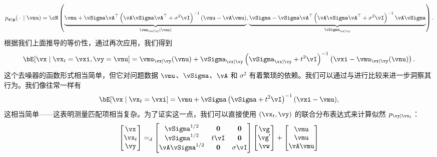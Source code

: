 \documentclass[../../book-main.tex]{subfiles}
\begin{document}
\begin{example}
  \begin{equation}
    p_{\x \mid \y}(\spcdot \mid \vnu) = \cN\left(
    \underbrace{%
      \vmu + \vSigma\vA^\top \left(\vA\vSigma\vA^\top + \sigma^2 \vI\right)^{-1} 
      (\vnu - \vA\vmu)}_{\vmu_{\vx \mid \vy}(\vnu)},
      \underbrace{%
      \vSigma - \vSigma \vA^\top \left(\vA\vSigma\vA^\top + \sigma^2
      \vI\right)^{-1} \vA \vSigma}_{\vSigma_{\vx\mid \vy}}
    \right).
  \end{equation}
  根据我们上面推导的等价性，通过再次应用，我们得到
  \begin{equation}\label{eq:conditional-posterior-denoiser-gaussian-case}
    \bE[ \vx \mid \vx_t=\vxi, \vy=\vnu ]
    =
    \vmu_{\vx\mid \vy}(\vnu) + \vSigma_{\vx\mid\vy}\left(
    \vSigma_{\vx\mid \vy} + t^2 \vI 
    \right)^{-1}\left(
    \vxi - \vmu_{\vx\mid \vy}(\vnu)
    \right).
  \end{equation}
  这个去噪器的函数形式相当简单，但它对问题数据 $\vmu$、$\vSigma$、$\vA$ 和 $\sigma^2$ 有着繁琐的依赖。我们可以通过与进行比较来进一步洞察其行为。我们像往常一样有
  \begin{equation}\label{eq:posterior-denoiser-gaussian-case}
    \bE[\vx \mid \vx_t=\vxi]
    = \vmu + \vSigma\left(\vSigma + t^2 \vI\right)^{-1} (\vxi - \vmu),
  \end{equation}
  这相当简单——这表明测量匹配项相当复杂。为了证实这一点，我们可以直接使用 $(\vx_t, \vy)$ 的联合分布表达式来计算似然 $p_{\vy \mid \vx_t}$：
  \begin{equation}
    \begin{bmatrix}
      \vx \\
      \vx_t \\
      \vy
    \end{bmatrix}
    =_{d}
    \begin{bmatrix}
      \vSigma^{1/2} & \Zero & \Zero \\
      \vSigma^{1/2} & t\vI & \Zero \\
      \vA \vSigma^{1/2} & \Zero & \sigma \vI
    \end{bmatrix}
    \begin{bmatrix}
      \vg \\
      \vg' \\
      \vw
    \end{bmatrix}
    +
    \begin{bmatrix}
      \vmu \\
      \vmu \\
      \vA\vmu

\end{bmatrix}
\end{equation}
\end{example}
\end{document}
